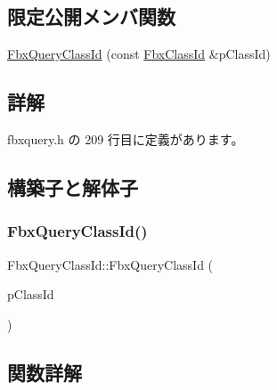 \subsection*{限定公開メンバ関数}
\begin{DoxyCompactItemize}
\item 
\hyperlink{class_fbx_query_class_id_adae8384b1b8f0853e84d4ff85509f27b}{Fbx\+Query\+Class\+Id} (const \hyperlink{class_fbx_class_id}{Fbx\+Class\+Id} \&p\+Class\+Id)
\end{DoxyCompactItemize}


\subsection{詳解}


 fbxquery.\+h の 209 行目に定義があります。



\subsection{構築子と解体子}
\mbox{\label{class_fbx_query_class_id_adae8384b1b8f0853e84d4ff85509f27b}} 
\subsubsection{\texorpdfstring{Fbx\+Query\+Class\+Id()}{FbxQueryClassId()}}
{\footnotesize\ttfamily Fbx\+Query\+Class\+Id\+::\+Fbx\+Query\+Class\+Id (\begin{DoxyParamCaption}\item[{const \hyperlink{class_fbx_class_id}{Fbx\+Class\+Id} \&}]{p\+Class\+Id }\end{DoxyParamCaption})\hspace{0.3cm}{\ttfamily [protected]}}



\subsection{関数詳解}
\mbox{\label{class_fbx_query_class_id_a8627c647cbb20945d7baf91e37c826f1}} 
